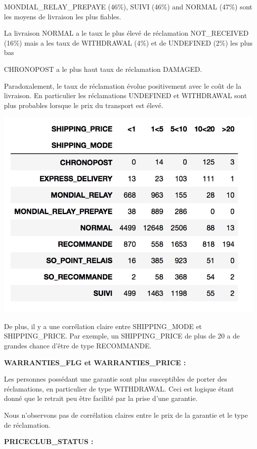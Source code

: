 MONDIAL_RELAY_PREPAYE (46\%), SUIVI (46\%) and NORMAL (47\%) sont les moyens de livraison
les plus fiables.

La livraison NORMAL a le taux le plus élevé de réclamation NOT_RECEIVED (16\%) mais a les taux
de WITHDRAWAL (4\%) et de UNDEFINED (2\%) les plus bas

CHRONOPOST a le plus haut taux de réclamation DAMAGED.

Paradoxalement, le taux de réclamation évolue positivement avec le coût de la livraison.
En particulier les réclamations UNDEFINED et WITHDRAWAL sont plus probables lorsque
le prix du transport est élevé. 

\begin{center}
\includegraphics[scale=0.5]{assets/shipping} 
\end{center}

De plus, il y a une corrélation claire entre SHIPPING_MODE et SHIPPING_PRICE. Par exemple,
un SHIPPING_PRICE de plus de 20 a de grandes chance d'être de type RECOMMANDE.

\textbf{WARRANTIES_FLG et WARRANTIES_PRICE :}

Les personnes possédant une garantie sont plus susceptibles de porter des réclamations, en 
particulier de type WITHDRAWAL. Ceci est logique étant donné que le retrait peu être 
facilité par la prise d'une garantie.

Nous n'observons pas de corrélation claires entre le prix de la garantie et le type de
réclamation.

\textbf{PRICECLUB_STATUS :}

